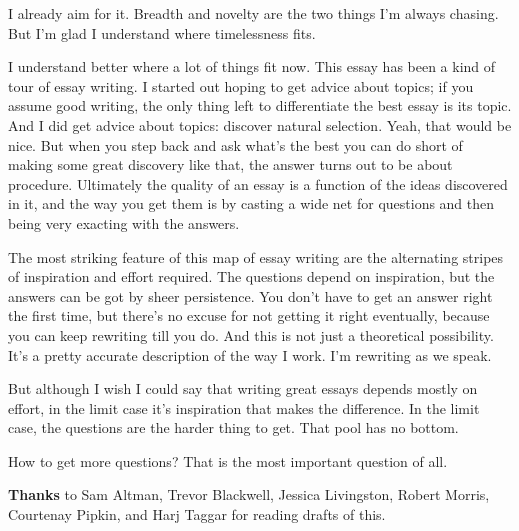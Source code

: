 I already aim for it. Breadth and novelty are the two things I'm always
chasing. But I'm glad I understand where timelessness fits.

I understand better where a lot of things fit now. This essay has been a
kind of tour of essay writing. I started out hoping to get advice about
topics; if you assume good writing, the only thing left to differentiate
the best essay is its topic. And I did get advice about topics: discover
natural selection. Yeah, that would be nice. But when you step back and
ask what's the best you can do short of making some great discovery like
that, the answer turns out to be about procedure. Ultimately the quality
of an essay is a function of the ideas discovered in it, and the way you
get them is by casting a wide net for questions and then being very
exacting with the answers.

The most striking feature of this map of essay writing are the
alternating stripes of inspiration and effort required. The questions
depend on inspiration, but the answers can be got by sheer persistence.
You don't have to get an answer right the first time, but there's no
excuse for not getting it right eventually, because you can keep
rewriting till you do. And this is not just a theoretical possibility.
It's a pretty accurate description of the way I work. I'm rewriting as
we speak.

But although I wish I could say that writing great essays depends mostly
on effort, in the limit case it's inspiration that makes the difference.
In the limit case, the questions are the harder thing to get. That pool
has no bottom.

How to get more questions? That is the most important question of all.


\textbf{Thanks} to Sam Altman, Trevor Blackwell, Jessica Livingston,
Robert Morris, Courtenay Pipkin, and Harj Taggar for reading drafts of
this.